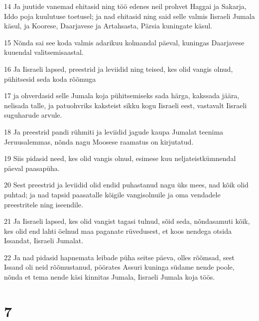 \par 14 Ja juutide vanemad ehitasid ning töö edenes neil prohvet Haggai ja Sakarja, Iddo poja kuulutuse toetusel; ja nad ehitasid ning said selle valmis Iisraeli Jumala käsul, ja Koorese, Daarjavese ja Artahsasta, Pärsia kuningate käsul.
\par 15 Nõnda sai see koda valmis adarikuu kolmandal päeval, kuningas Daarjavese kuuendal valitsemisaastal.
\par 16 Ja Iisraeli lapsed, preestrid ja leviidid ning teised, kes olid vangis olnud, pühitsesid seda koda rõõmuga
\par 17 ja ohverdasid selle Jumala koja pühitsemiseks sada härga, kakssada jäära, nelisada talle, ja patuohvriks kaksteist sikku kogu Iisraeli eest, vastavalt Iisraeli suguharude arvule.
\par 18 Ja preestrid pandi rühmiti ja leviidid jagude kaupa Jumalat teenima Jeruusalemmas, nõnda nagu Moosese raamatus on kirjutatud.
\par 19 Siis pidasid need, kes olid vangis olnud, esimese kuu neljateistkümnendal päeval paasapüha.
\par 20 Sest preestrid ja leviidid olid endid puhastanud nagu üks mees, nad kõik olid puhtad; ja nad tapsid paasatalle kõigile vangisolnuile ja oma vendadele preestritele ning iseendile.
\par 21 Ja Iisraeli lapsed, kes olid vangist tagasi tulnud, sõid seda, nõndasamuti kõik, kes olid end lahti öelnud maa paganate rüvedusest, et koos nendega otsida Issandat, Iisraeli Jumalat.
\par 22 Ja nad pidasid hapnemata leibade püha seitse päeva, olles rõõmsad, sest Issand oli neid rõõmustanud, pöörates Assuri kuninga südame nende poole, nõnda et tema nende käsi kinnitas Jumala, Iisraeli Jumala koja töös.

\chapter{7}

